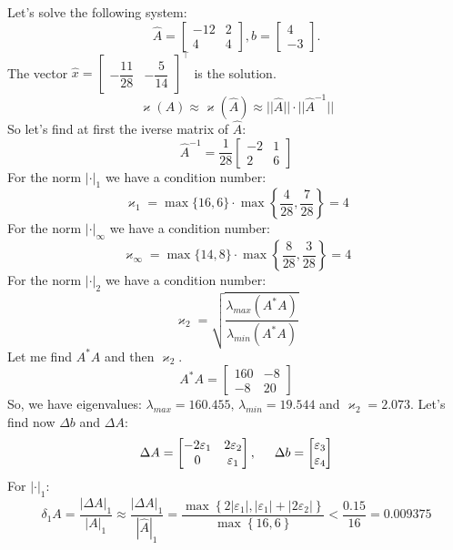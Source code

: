 \documentclass[12pt]{report}
\begin{document}
\begin{solution}
   Let's solve the following system:
   \[
      \hat{A} = \begin{bmatrix} -12 & 2 \\ 4 & 4\end{bmatrix}, \hat{b} = \begin{bmatrix} 4 \\-3\end{bmatrix}.
   \]
   The vector $\hat{x} = \begin{bmatrix} -\dfrac{11}{28} & -\dfrac{5}{14}\end{bmatrix}^\intercal$ is the solution.
   \[
      \varkappa(A) \approx \varkappa(\hat{A}) \approx ||\hat{A}||\cdot||\hat{A}^{-1}||
   \]
   So let's find at first the iverse matrix of $\hat{A}$:
   \[
      \hat{A}^{-1} = \dfrac{1}{28}\begin{bmatrix}
         -2 & 1\\
         2 & 6
      \end{bmatrix} 
   \]
   For the norm $|\cdot|_1$ we have a condition number:
\[
   \varkappa_1 = \max\{16, 6\} \cdot \max\left\{\dfrac{4}{28}, \dfrac{7}{28}\right\}= 4
\]
For the norm $|\cdot|_{\infty}$ we have a condition number:
\[
   \varkappa_{\infty} = \max\{14,8\} \cdot \max\left\{\dfrac{8}{28}, \dfrac{3}{28}\right\}=4 \]
   For the norm $|\cdot|_2$ we have a condition number:
   \[\varkappa_2 = \sqrt{\dfrac{\lambda_{max}(A^*A)}{\lambda_{min}(A^*A)}}\]
   Let me find $A^*A$ and then $\varkappa_2$.
   \[
      A^*A =\begin{bmatrix}
         160  & -8 \\
        -8  &  20 
       \end{bmatrix} 
   \]
   So, we have eigenvalues: $ \lambda_{max} = 160.455,\, \lambda_{min} = 19.544$ and $\varkappa_2 = 2.073$. Let's find now $\Delta b$ and $\Delta A$:
   \[
       \Delta A = \begin{bmatrix}
         -2\varepsilon_1 & 2\varepsilon_2 \\
         0 & \varepsilon_1
       \end{bmatrix}, \hspace*{0.5cm} \Delta b = \begin{bmatrix}
         \varepsilon_3 \\ \varepsilon_4
       \end{bmatrix}
   \]
For $|\cdot |_1$:
   \[
      \delta_1 A =\dfrac{|\Delta A|_1}{|A|_1}\approx \dfrac{|\Delta A|_1}{|\hat{A}|_1} = \dfrac{\max\left\{2|\varepsilon_1|, |\varepsilon_1| + |2\varepsilon_2|\right\}}{\max\left\{16 , 6\right\}} < \dfrac{0.15}{16}= 0.009375
\]
\end{solution}
\end{document}
